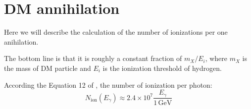 \section{DM annihilation}

Here we will describe the calculation of the number of ionizations per one anihilation.

The bottom line is that it is roughly a constant fraction of $m_X/E_i$, where $m_X$ is the mass of DM particle and $E_i$ is the ionization threshold of hydrogen.

According the Equation 12 of \cite{Belikov_2009}, the number of ionization per photon:
\begin{equation}
N_\mathrm{ion}(E_\gamma) \approx 2.4\times10^7\dfrac{E_\gamma}{1\,\mathrm{GeV}}
\end{equation}